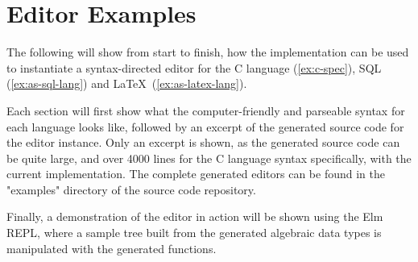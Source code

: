 \chapter{Editor Examples}
\label{ch:examples}

The following will show from start to finish, how the implementation
can be used to instantiate a syntax-directed editor for the C language (\cref{ex:c-spec}),
SQL (\cref{ex:as-sql-lang}) and \LaTeX \ (\cref{ex:as-latex-lang}).

Each section will first show what the computer-friendly and parseable syntax
for each language looks like, followed by an excerpt of the generated
source code for the editor instance. Only an excerpt is shown, as the
generated source code can be quite large, and over 4000 lines for the C language
syntax specifically, with the current implementation. The complete generated
editors can be found in the "examples" directory of the source code repository.

Finally, a demonstration of the editor
in action will be shown using the Elm REPL, where a sample tree built
from the generated algebraic data types is manipulated with the generated functions.

